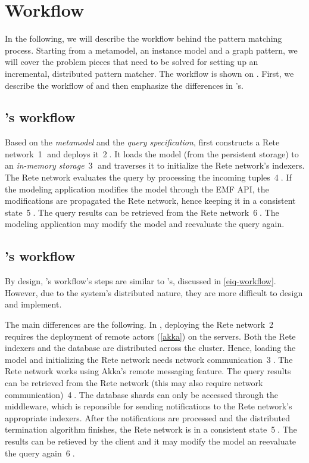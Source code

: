 
\section{Workflow}
\label{workflow}


In the following, we will describe the workflow behind the pattern matching process. Starting from a metamodel, an instance model and a graph pattern, we will cover the problem pieces that need to be solved for setting up an incremental, distributed pattern matcher. The workflow is shown on . First, we describe the workflow of \eiq{} and then emphasize the differences in \iqd{}'s.

\subsection{\eiq{}'s workflow}
\label{eiq-workflow}

Based on the \emph{metamodel} and the \emph{query specification}, \eiq{} first constructs a Rete network~\textcircled{1} and deploys it~\textcircled{2}. It loads the model (from the persistent storage) to an \emph{in-memory storage}~\textcircled{3} and traverses it to initialize the Rete network's indexers. The Rete network evaluates the query by processing the incoming tuples~\textcircled{4}. If the modeling application modifies the model through the EMF API, the modifications are propagated the Rete network, hence keeping it in a consistent state~\textcircled{5}. The query results can be retrieved from the Rete network~\textcircled{6}. The modeling application may modify the model and reevaluate the query again.

\subsection{\iqd{}'s workflow}
\label{iqd-workflow}

By design, \iqd{}'s workflow's steps are similar to \eiq{}'s, discussed in \autoref{eiq-workflow}. However, due to the system's distributed nature, they are more difficult to design and implement.

The main differences are the following. In \iqd{}, deploying the Rete network~\textcircled{2} requires the deployment of remote actors (\autoref{akka}) on the servers. Both the Rete indexers and the database are distributed across the cluster. Hence, loading the model and initializing the Rete network needs network communication~\textcircled{3}. The Rete network works using Akka's remote messaging feature. The query results can be retrieved from the Rete network (this may also require network communication)~\textcircled{4}. The database shards can only be accessed through the middleware, which is reponsible for sending notifications to the Rete network's appropriate indexers. After the notifications are processed and the distributed termination algorithm finishes, the Rete network is in a consistent state~\textcircled{5}. The results can be retieved by the client and it may modify the model an reevaluate the query again~\textcircled{6}. 
